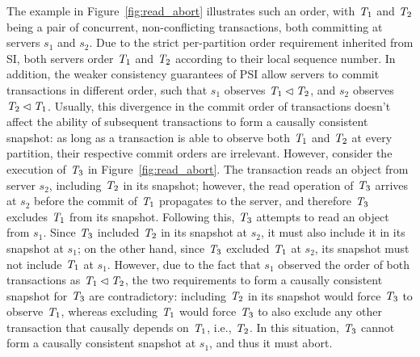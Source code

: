 The example in Figure~\ref{fig:read_abort} illustrates such an order, with $\mathit{T}_1$ and $\mathit{T}_2$ being a pair of concurrent, non-conflicting transactions, both committing at servers $s_1$ and $s_2$. Due to the strict per-partition order requirement inherited from SI, both servers order $\mathit{T}_1$ and $\mathit{T}_2$ according to their local sequence number. In addition, the weaker consistency guarantees of PSI allow servers to commit transactions in different order, such that $s_1$ observes $\mathit{T}_1 \lhd \mathit{T}_2$, and $s_2$ observes $\mathit{T}_2 \lhd \mathit{T}_1$. Usually, this divergence in the commit order of transactions doesn't affect the ability of subsequent transactions to form a causally consistent snapshot: as long as a transaction is able to observe both $\mathit{T}_1$ and $\mathit{T}_2$ at every partition, their respective commit orders are irrelevant. However, consider the execution of $\mathit{T}_3$ in Figure~\ref{fig:read_abort}. The transaction reads an object from server $s_2$, including $\mathit{T}_2$ in its snapshot; however, the read operation of $\mathit{T}_3$ arrives at $s_2$ before the commit of $\mathit{T}_1$ propagates to the server, and therefore $\mathit{T}_3$ excludes $\mathit{T}_1$ from its snapshot. Following this, $\mathit{T}_3$ attempts to read an object from $s_1$. Since $\mathit{T}_3$ included $\mathit{T}_2$ in its snapshot at $s_2$, it must also include it in its snapshot at $s_1$; on the other hand, since $\mathit{T}_3$ excluded $\mathit{T}_1$ at $s_2$, its snapshot must not include $\mathit{T}_1$ at $s_1$. However, due to the fact that $s_1$ observed the order of both transactions as $\mathit{T}_1 \lhd \mathit{T}_2$, the two requirements to form a causally consistent snapshot for $\mathit{T}_3$ are contradictory: including $\mathit{T}_2$ in its snapshot would force $\mathit{T}_3$ to observe $\mathit{T}_1$, whereas excluding $\mathit{T}_1$ would force $\mathit{T}_3$ to also exclude any other transaction that causally depends on $\mathit{T}_1$, i.e., $\mathit{T}_2$. In this situation, $\mathit{T}_3$ cannot form a causally consistent snapshot at $s_1$, and thus it must abort.
